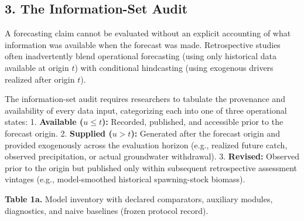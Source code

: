 \documentclass[11pt]{article}
\begin{document}
\subsection{3. The Information-Set
Audit}\label{the-information-set-audit}

A forecasting claim cannot be evaluated without an explicit accounting
of what information was available when the forecast was made.
Retrospective studies often inadvertently blend operational forecasting
(using only historical data available at origin \(t\)) with conditional
hindcasting (using exogenous drivers realized after origin \(t\)).

The information-set audit requires researchers to tabulate the
provenance and availability of every data input, categorizing each into
one of three operational states: 1. \textbf{Available (\(u \le t\)):}
Recorded, published, and accessible prior to the forecast origin. 2.
\textbf{Supplied (\(u > t\)):} Generated after the forecast origin and
provided exogenously across the evaluation horizon (e.g., realized
future catch, observed precipitation, or actual groundwater withdrawal).
3. \textbf{Revised:} Observed prior to the origin but published only
within subsequent retrospective assessment vintages (e.g.,
model-smoothed historical spawning-stock biomass).

\textbf{Table 1a.} Model inventory with declared comparators, auxiliary
modules, diagnostics, and naive baselines (frozen protocol record).
\end{document}
